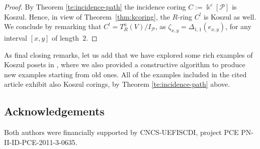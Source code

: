 \documentclass[pdftex]{sigma}
\newcommand\kal{\mathscr}
\renewcommand{\^}[1]{\mbox{$^{\left( #1 \right)}$}}
\renewcommand{\_}[1]{\mbox{$_{\left( #1 \right)}$}}
\numberwithin{equation}{section}
\begin{document}
\begin{proof}
By Theorem \ref{te:incidence-path} the incidence coring $C:=\Bbbk^c[\kal{P} ]$ is Koszul. Hence, in view of Theorem~\ref{thm:kcoring}, the $R$-ring $C^!$ is Koszul as well. We conclude by remarking that $C^!=T_R^a(V)/I_\kal{P}$, as $\zeta_{x,y}=\Delta_{1,1}(e_{x,y} ) $, for any interval $[x,y] $ of length~$2$.
\end{proof}

As f\/inal closing remarks, let us add that we have explored some rich examples of Koszul posets in \cite[Section~2]{mst}, where we also provided a constructive algorithm to produce new examples starting from old ones. All of the examples included in the cited article exhibit also Koszul corings, by Theorem \ref{te:incidence-path} above.

\subsection*{Acknowledgements}

Both authors were f\/inancially supported by CNCS-UEFISCDI, project PCE PN-II-ID-PCE-2011-3-0635.
\end{document}
